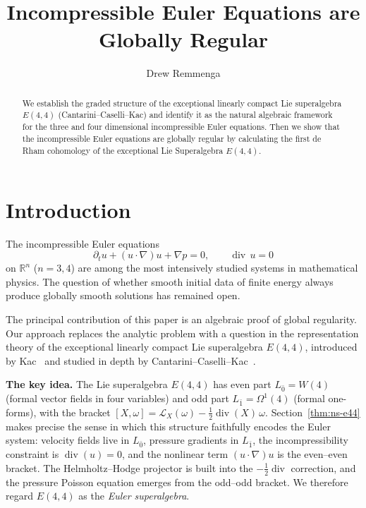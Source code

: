 \documentclass[reqno,10pt]{amsart}
\theoremstyle{definition}
\begin{document}
\title{Incompressible Euler Equations are Globally Regular}
\author{Drew Remmenga}
\address{
  Unaffiliated\\
  No Department\\
  Fort Collins, CO, 80525\\
  United States
}

\maketitle
\begin{abstract}
We establish the graded structure of the exceptional linearly compact Lie superalgebra
$E(4,4)$ (Cantarini--Caselli--Kac) and identify it as the natural algebraic
framework for the three and four dimensional incompressible Euler equations.
Then we show that the incompressible Euler equations are globally regular by calculating the first de Rham cohomology of the exceptional Lie Superalgebra $E(4,4)$.
\end{abstract}
\setcounter{tocdepth}{2}
\section{Introduction}

The incompressible Euler equations
\begin{equation}\label{eq:Euler}
  \partial_t u + (u\cdot\nabla)u + \nabla p = 0,
  \qquad \operatorname{div}\,u = 0
\end{equation}
on $\mathbb{R}^n$ ($n=3,4$) are among the most intensively studied systems in
mathematical physics.  The question of whether smooth initial data of finite
energy always produce globally smooth solutions has remained open.

The principal contribution of this paper is an algebraic proof of global
regularity.  Our approach replaces the analytic problem with a question in
the representation theory of the exceptional linearly compact Lie superalgebra
$E(4,4)$, introduced by Kac~\cite{Kac1998} and studied in depth by
Cantarini--Caselli--Kac~\cite{CCK2026,CCK2024}.

\medskip
\noindent\textbf{The key idea.}
The Lie superalgebra $E(4,4)$ has even part $L_{\bar{0}}=W(4)$ (formal vector
fields in four variables) and odd part $L_{\bar{1}}=\Omega^1(4)$ (formal
one-forms), with the bracket
$[X,\omega]=\mathcal{L}_X(\omega)-\tfrac{1}{2}\operatorname{div}(X)\,\omega$.
Section~\ref{thm:ns-e44} makes precise the sense in which this structure
faithfully encodes the Euler system: velocity fields live in $L_{\bar{0}}$,
pressure gradients in $L_{\bar{1}}$, the incompressibility constraint is
$\operatorname{div}(u)=0$, and the nonlinear term $(u\cdot\nabla)u$ is
the even--even bracket.  The Helmholtz--Hodge projector is built into
the $-\tfrac{1}{2}\operatorname{div}$ correction, and the pressure Poisson
equation emerges from the odd--odd bracket.  We therefore regard
$E(4,4)$ as the \emph{Euler superalgebra}.
\end{document}
